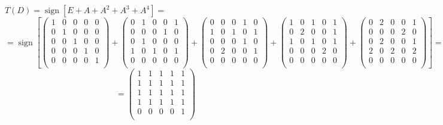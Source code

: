 \documentclass[fleqn]{article}
\DeclareMathOperator{\sign}{sign}
\begin{document}
$T(D)= \sign{[E + A + A^2 + A^3 + A^4]}=$
$$=\sign\left[\begin{pmatrix}
1 & 0 & 0 & 0 & 0\\
0 & 1 & 0 & 0 & 0\\
0 & 0 & 1 & 0 & 0\\
0 & 0 & 0 & 1 & 0\\
0 & 0 & 0 & 0 & 1\\
\end{pmatrix}
+
\begin{pmatrix}
0 & 1 & 0 & 0 & 1 \\
0 & 0 & 0 & 1 & 0 \\
0 & 1 & 0 & 0 & 0 \\
1 & 0 & 1 & 0 & 1 \\
0 & 0 & 0 & 0 & 0 \\
\end{pmatrix}
+
\begin{pmatrix}
0 & 0 & 0 & 1 & 0 \\
1 & 0 & 1 & 0 & 1 \\
0 & 0 & 0 & 1 & 0 \\
0 & 2 & 0 & 0 & 1 \\
0 & 0 & 0 & 0 & 0 \\
\end{pmatrix}
+
\begin{pmatrix}
1 & 0 & 1 & 0 & 1 \\
0 & 2 & 0 & 0 & 1 \\
1 & 0 & 1 & 0 & 1 \\
0 & 0 & 0 & 2 & 0 \\
0 & 0 & 0 & 0 & 0 \\
\end{pmatrix}
+
\begin{pmatrix}
0 & 2 & 0 & 0 & 1 \\
0 & 0 & 0 & 2 & 0 \\
0 & 2 & 0 & 0 & 1 \\
2 & 0 & 2 & 0 & 2 \\
0 & 0 & 0 & 0 & 0 \\
\end{pmatrix}\right]
=$$
$$=\begin{pmatrix}
1 & 1 & 1 & 1 & 1\\
1 & 1 & 1 & 1 & 1\\
1 & 1 & 1 & 1 & 1\\
1 & 1 & 1 & 1 & 1\\
0 & 0 & 0 & 0 & 1\\
\end{pmatrix}
$$
\end{document}
